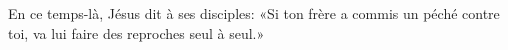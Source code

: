 En ce temps-là, Jésus dit à ses disciples:
	«Si ton frère a commis un péché contre toi,
	va lui faire des reproches seul à seul.»
